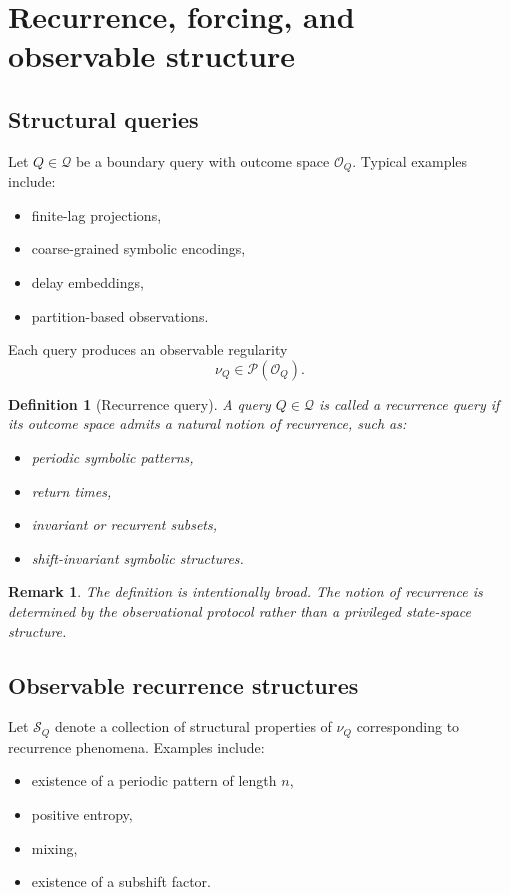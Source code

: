 \documentclass[11pt]{article}
\newtheorem{definition}{Definition}
\newtheorem{remark}{Remark}
\begin{document}
\section{Recurrence, forcing, and observable structure}

\subsection{Structural queries}

Let $Q\in\mathcal Q$ be a boundary query with outcome space $\mathcal O_Q$.
Typical examples include:
\begin{itemize}
\item finite-lag projections,
\item coarse-grained symbolic encodings,
\item delay embeddings,
\item partition-based observations.
\end{itemize}

Each query produces an observable regularity
\[
\nu_Q \in \mathcal P(\mathcal O_Q).
\]

\begin{definition}[Recurrence query]
A query $Q\in\mathcal Q$ is called a \emph{recurrence query} if its outcome
space admits a natural notion of recurrence, such as:
\begin{itemize}
\item periodic symbolic patterns,
\item return times,
\item invariant or recurrent subsets,
\item shift-invariant symbolic structures.
\end{itemize}
\end{definition}

\begin{remark}
The definition is intentionally broad. The notion of recurrence is determined
by the observational protocol rather than a privileged state-space structure.
\end{remark}

\subsection{Observable recurrence structures}

Let $\mathcal S_Q$ denote a collection of structural properties of
$\nu_Q$ corresponding to recurrence phenomena. Examples include:
\begin{itemize}
\item existence of a periodic pattern of length $n$,
\item positive entropy,
\item mixing,
\item existence of a subshift factor.
\end{itemize}
\end{document}
